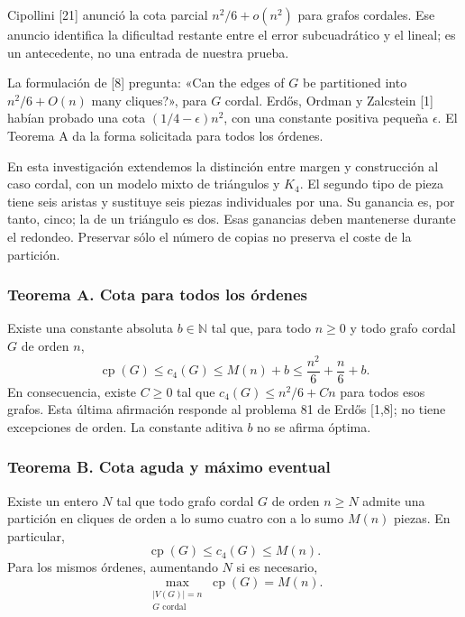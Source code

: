 \documentclass[spanish,11pt,a4paper]{article}
\begin{document}
Cipollini {[}21{]} anunció la cota parcial \(n^2/6+o(n^2)\) para grafos cordales. Ese anuncio identifica la dificultad restante entre el error subcuadrático y el lineal; es un antecedente, no una entrada de nuestra prueba.

La formulación de {[}8{]} pregunta: «Can the edges of \(G\) be partitioned into \(n^2/6+O(n)\) many cliques?», para \(G\) cordal. Erdős, Ordman y Zalcstein {[}1{]} habían probado una cota \((1/4-\epsilon)n^2\), con una constante positiva pequeña \(\epsilon\). El Teorema A da la forma solicitada para todos los órdenes.

En esta investigación extendemos la distinción entre margen y construcción al caso cordal, con un modelo mixto de triángulos y \(K_4\). El segundo tipo de pieza tiene seis aristas y sustituye seis piezas individuales por una. Su ganancia es, por tanto, cinco; la de un triángulo es dos. Esas ganancias deben mantenerse durante el redondeo. Preservar sólo el número de copias no preserva el coste de la partición.

\subsubsection{Teorema A. Cota para todos los órdenes}\label{teorema-a.-cota-para-todos-los-ordenes}

Existe una constante absoluta \(b\in\mathbb N\) tal que, para todo \(n\ge0\) y todo grafo cordal \(G\) de orden \(n\), \[
\operatorname{cp}(G)\le c_4(G)\le M(n)+b
\le\frac{n^2}{6}+\frac n6+b.
\tag{A}
\] En consecuencia, existe \(C\ge0\) tal que \(c_4(G)\le n^2/6+Cn\) para todos esos grafos. Esta última afirmación responde al problema 81 de Erdős {[}1,8{]}; no tiene excepciones de orden. La constante aditiva \(b\) no se afirma óptima.

\subsubsection{Teorema B. Cota aguda y máximo eventual}\label{teorema-b.-cota-aguda-y-maximo-eventual}

Existe un entero \(N\) tal que todo grafo cordal \(G\) de orden \(n\ge N\) admite una partición en cliques de orden a lo sumo cuatro con a lo sumo \(M(n)\) piezas. En particular, \[
\operatorname{cp}(G)\le c_4(G)\le M(n).
\tag{1.1}
\] Para los mismos órdenes, aumentando \(N\) si es necesario, \[
\max_{\substack{|V(G)|=n\\G\text{ cordal}}}\operatorname{cp}(G)=M(n).
\tag{1.2}
\]
\end{document}
